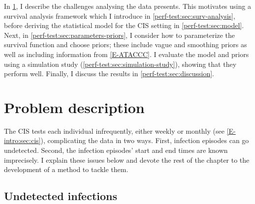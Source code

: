\documentclass[thesis.tex]{subfiles}
\begin{document}
In \cref{perf-test:sec:problem}, I describe the challenges analysing the data presents.
This motivates using a survival analysis framework which I introduce in \cref{perf-test:sec:surv-analysis}, before deriving the statistical model for the CIS setting in \cref{perf-test:sec:model}.
Next, in \cref{perf-test:sec:parameters-priors}, I consider how to parameterize the survival function and choose priors; these include vague and smoothing priors as well as including information from \cref{E-ATACCC}.
I evaluate the model and priors using a simulation study (\cref{perf-test:sec:simulation-study}), showing that they perform well.
Finally, I discuss the results in \cref{perf-test:sec:discussion}.

\section{Problem description} \label{perf-test:sec:problem}

The CIS tests each individual infrequently, either weekly or monthly (see \cref{E-intro:sec:cis}), complicating the data in two ways.
First, infection episodes can go undetected.
Second, the infection episodes' start and end times are known imprecisely.
I explain these issues below and devote the rest of the chapter to the development of a method to tackle  them.

\subsection{Undetected infections} \label{perf-test:sec:undetected}
\end{document}
